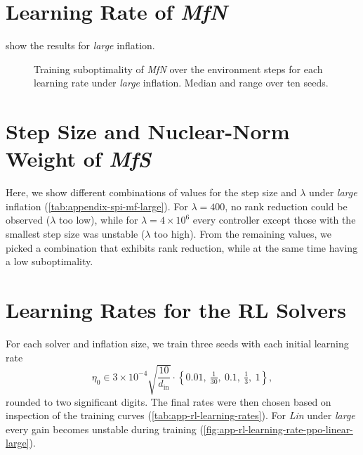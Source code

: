 

\section{Learning Rate of \emph{MfN}}
\label{sec:app-learning-rate-mf-npg}

 show the results for
\emph{large} inflation.

\begin{figure}[htbp]
  \centering
  \caption{Training suboptimality of \emph{MfN} over the environment steps for each learning rate
    under \emph{large} inflation. Median and range over ten seeds.}
  \label{fig:app-learning-rate-mf-npg-large}
\end{figure}



\section{Step Size and Nuclear-Norm Weight of \emph{MfS}}
\label{sec:app-spi-mf}

Here, we show different combinations of values for the step size
and $\lambda$ under \emph{large} inflation (\cref{tab:appendix-spi-mf-large}).
For $\lambda = 400$, no rank reduction could be observed ($\lambda$ too low),
while for $\lambda = 4 \times 10^{6}$ every controller except those with the smallest step size
was unstable ($\lambda$ too high).
From the remaining values, we picked a combination that exhibits rank reduction, while
at the same time having a low suboptimality.



\section{Learning Rates for the RL Solvers}
\label{sec:app-rl-learning-rate}

For each solver and inflation size, we train three seeds with each initial learning rate
\begin{equation}
  \label{eq:app-rl-learning-rate-grid}
  \eta_0 \in 3 \times 10^{-4} \sqrt{\frac{10}{d_{\mathrm{in}}}} \cdot \left\{ 0.01,\ \tfrac{1}{30},\ 0.1,\ \tfrac{1}{3},\ 1 \right\} ,
\end{equation}
rounded to two significant digits. The final rates were then chosen based on inspection of the training curves (\cref{tab:app-rl-learning-rates}).
For \emph{Lin} under \emph{large} every gain becomes unstable during training (\cref{fig:app-rl-learning-rate-ppo-linear-large}).

